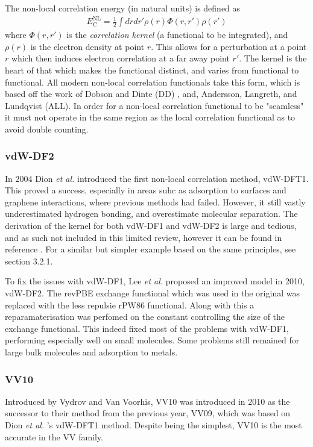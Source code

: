 \documentclass[10pt,a4paper,twocolumn,twoside]{extarticle}
\newcommand{\al}{\emph{et al. }}
\begin{document}
	The non-local correlation energy (in natural units) is defined as 
	\begin{align}
		E^\text{NL}_\text{C} = \frac{1}{2} \int dr dr' \rho(r) \Phi(r, r') \rho(r')
	\end{align}
	where $\Phi(r, r')$ is the \emph{correlation kernel} (a functional to be integrated), and $\rho(r)$ is the electron density at point $r$. This allows for a perturbation at a point $r$ which then induces electron correlation at a far away point $r'$. The kernel is the heart of that which makes the functional distinct, and varies from functional to functional. All modern non-local correlation functionals take this form, which is based off the work of Dobson and Dinte (DD) \cite{DD}, and, Andersson, Langreth, and Lundqvist (ALL)\cite{ALL}.
	In order for a non-local correlation functional to be "seamless" it must not operate in the same region as the local correlation functional as to avoid double counting. 

	\subsubsection{vdW-DF2}
	In 2004 Dion \al introduced the first non-local correlation method, vdW-DFT1. \cite{vdw04Original-Dion2004} This proved a success, especially in areas suhc as adsorption to surfaces and graphene interactions, where previous methods had failed. \cite{vdW-review} However, it still vastly underestimated hydrogen bonding, and overestimate molecular separation. The derivation of the kernel for both vdW-DF1 and vdW-DF2 is large and tedious, and as such not included in this limited review, however it can be found in reference \cite{vdw04Original-Dion2004}. For a similar but simpler example based on the same principles, see section 3.2.1.

	To fix the issues with vdW-DF1, Lee \al proposed an improved model in 2010, vdW-DF2. \cite{Lee2010-vdW-DF2-Original} The revPBE\cite{revPBE} exchange functional which was used in the original was replaced with the less repulsie rPW86 functional. \cite{rPW86} Along with this a reparamaterisation was perfomed on the constant controlling the size of the exchange functional. This indeed fixed most of the problems with vdW-DF1, performing especially well on small molecules. Some problems still remained for large bulk molecules and adsorption to metals. 


	\subsubsection{VV10}
	\label{sec:VV10}
	Introduced by Vydrov and Van Voorhis, VV10 was introduced in 2010 as the successor to their method from the previous year, VV09, which was based on Dion \al's vdW-DFT1 method.\cite{VV09Original-Vydrov2009}\cite{Vydrov2010} 
	Despite being the simplest, VV10 is the most accurate in the VV family.\cite{Grimme2011} 
\end{document}
